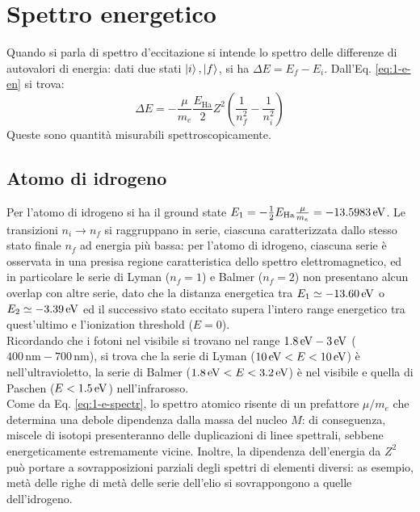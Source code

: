\section{Spettro energetico}

Quando si parla di spettro d'eccitazione si intende lo spettro delle differenze di autovalori di energia: dati due stati $ \ket{i} , \ket{f} $, si ha $ \Delta E = E_f - E_i $. Dall'Eq. \ref{eq:1-e-en} si trova:
\begin{equation}
	\Delta E = - \frac{\mu}{m_e} \frac{E_\text{Ha}}{2} Z^2 \left( \frac{1}{n_f^2} - \frac{1}{n_i^2} \right)
	\label{eq:1-e-spectr}
\end{equation}
Queste sono quantità misurabili spettroscopicamente.

\subsection{Atomo di idrogeno}

Per l'atomo di idrogeno si ha il ground state $ E_1 = - \frac{1}{2} E_\text{Ha} \frac{\mu}{m_e} = - 13.5983\,\mathrm{eV} $. Le transizioni $ n_i \rightarrow n_f $ si raggruppano in serie, ciascuna caratterizzata dallo stesso stato finale $ n_f $ ad energia più bassa: per l'atomo di idrogeno, ciascuna serie è osservata in una presisa regione caratteristica dello spettro elettromagnetico, ed in particolare le serie di Lyman ($ n_f = 1 $) e Balmer ($ n_f = 2 $) non presentano alcun overlap con altre serie, dato che la distanza energetica tra $ E_1 \simeq - 13.60\,\mathrm{eV} $ o $ E_2 \simeq -3.39\,\mathrm{eV} $ ed il successivo stato eccitato supera l'intero range energetico tra quest'ultimo e l'ionization threshold ($ E = 0 $).\\
Ricordando che i fotoni nel visibile si trovano nel range $ 1.8\,\mathrm{eV} - 3\,\mathrm{eV} $ ($ 400\,\text{nm} - 700\,\text{nm} $), si trova che la serie di Lyman ($ 10\,\mathrm{eV} < E < 10\,\mathrm{eV} $) è nell'ultravioletto, la serie di Balmer ($ 1.8\,\mathrm{eV} < E < 3.2\,\mathrm{eV} $) è nel visibile e quella di Paschen ($ E < 1.5\,\mathrm{eV} $) nell'infrarosso.\\
Come da Eq. \ref{eq:1-e-spectr}, lo spettro atomico risente di un prefattore $ \mu / m_e $ che determina una debole dipendenza dalla massa del nucleo $ M $: di conseguenza, miscele di isotopi presenteranno delle duplicazioni di linee spettrali, sebbene energeticamente estremamente vicine. Inoltre, la dipendenza dell'energia da $ Z^2 $ può portare a sovrapposizioni parziali degli spettri di elementi diversi: as esempio, metà delle righe di metà delle serie dell'elio si sovrappongono a quelle dell'idrogeno.


